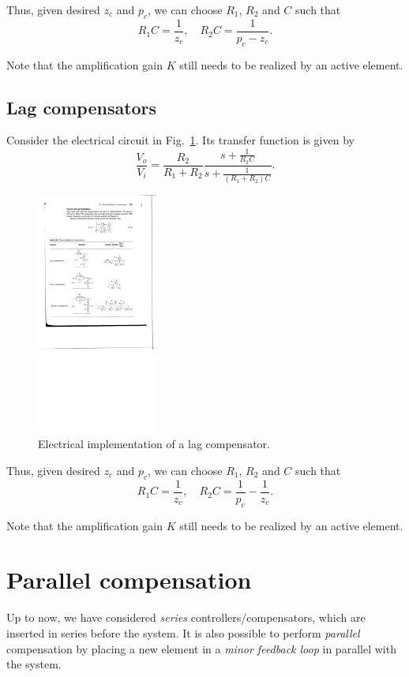 \documentclass[a4paper,11pt]{report}
\theoremstyle{definition}
\begin{document}
Thus, given desired $z_c$ and $p_c$, we can choose $R_1$, $R_2$ and
$C$ such that
\[
R_1C = \frac{1}{z_c},\quad R_2C = \frac{1}{p_c-z_c}.
\]

Note that the amplification gain $K$ still needs to be realized by
an active element.


\subsection{Lag compensators}

Consider the electrical circuit in Fig.~\ref{fig:impl-lag}. Its
transfer function is given by
\[
\frac{V_o}{V_i} = \frac{R_2}{R_1+R_2}\frac{s+\frac{1}{R_2C}}{s+\frac{1}{(R_1+R_2)C}}.
\]

\begin{figure}[H]
  \centering
  \includegraphics[width=4cm]{fig/impl-lag.pdf}
  \caption{Electrical implementation of a lag compensator.}
  \label{fig:impl-lag}
\end{figure}

Thus, given desired $z_c$ and $p_c$, we can choose $R_1$, $R_2$ and
$C$ such that
\[
R_1C = \frac{1}{z_c},\quad R_2C = \frac{1}{p_c}-\frac{1}{z_c}.
\]

Note that the amplification gain $K$ still needs to be realized by
an active element.


\section{Parallel compensation}

Up to now, we have considered \emph{series} controllers/compensators,
which are inserted in series before the system. It is also possible to
perform \emph{parallel} compensation by placing a new element in a
\emph{minor feedback loop} in parallel with the system.
\end{document}
